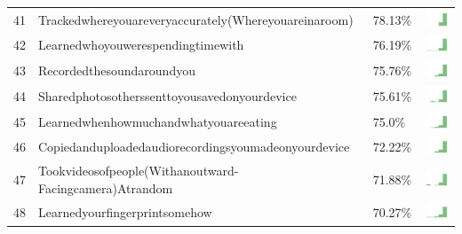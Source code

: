 \documentclass[a4paper,12pt]{article}
\begin{document}
\begin{longtable}{| p{0.5cm} | p{7cm} | p{1cm} | c |}
41 & Trackedwhereyouareveryaccurately(Whereyouareinaroom) & 78.13\% & \includegraphics[width = 2cm, height = 0.5cm]{trackedwhereyouareveryaccurately(whereyouareinaroom)WORKCONTACTS} \\  
42 & Learnedwhoyouwerespendingtimewith & 76.19\% & \includegraphics[width = 2cm, height = 0.5cm]{learnedwhoyouwerespendingtimewithWORKCONTACTS} \\  
43 & Recordedthesoundaroundyou & 75.76\% & \includegraphics[width = 2cm, height = 0.5cm]{recordedthesoundaroundyouWORKCONTACTS} \\  
44 & Sharedphotosotherssenttoyousavedonyourdevice & 75.61\% & \includegraphics[width = 2cm, height = 0.5cm]{sharedphotosotherssenttoyousavedonyourdeviceWORKCONTACTS} \\  
45 & Learnedwhenhowmuchandwhatyouareeating & 75.0\% & \includegraphics[width = 2cm, height = 0.5cm]{learnedwhenhowmuchandwhatyouareeatingWORKCONTACTS} \\  
46 & Copiedanduploadedaudiorecordingsyoumadeonyourdevice & 72.22\% & \includegraphics[width = 2cm, height = 0.5cm]{copiedanduploadedaudiorecordingsyoumadeonyourdeviceWORKCONTACTS} \\  
47 & Tookvideosofpeople(Withanoutward-Facingcamera)Atrandom & 71.88\% & \includegraphics[width = 2cm, height = 0.5cm]{tookvideosofpeople(withanoutward-facingcamera)atrandomWORKCONTACTS} \\  
48 & Learnedyourfingerprintsomehow & 70.27\% & \includegraphics[width = 2cm, height = 0.5cm]{learnedyourfingerprintsomehowWORKCONTACTS} \\  

\end{longtable}
\end{document}
